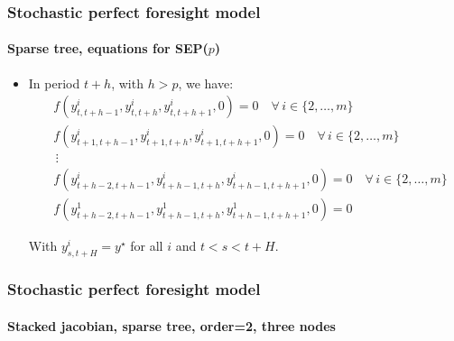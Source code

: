 \documentclass{beamer}
\begin{document}
\begin{frame}
   \frametitle{Stochastic perfect foresight model}
   \framesubtitle{Sparse tree, equations for SEP($p$)}

   \begin{itemize}

      \item In period $t+h$, with $h>p$, we have:
            \[
               \begin{split}
                   & f\left(y_{t,t+h-1}^i, y_{t,t+h}^i, y_{t,t+h+1}^i, 0\right) = 0 \quad \forall\, i\in\{2,\ldots,m\}              \\
                   & f\left(y_{t+1,t+h-1}^i, y_{t+1,t+h}^i, y_{t+1, t+h+1}^i, 0\right) = 0\quad \forall\, i\in\{2,\ldots,m\}        \\
                   & \,\vdots                                                                                                       \\
                   & f\left(y_{t+h-2,t+h-1}^i, y_{t+h-1,t+h}^i, y_{t+h-1,t+h+1}^i, 0 \right) = 0 \quad \forall\, i\in\{2,\ldots,m\} \\
                   & f\left(y_{t+h-2,t+h-1}^1, y_{t+h-1,t+h}^1, y_{t+h-1,t+h+1}^1, 0 \right) = 0
               \end{split}
            \]

            \medskip

            With $y_{s,t+H}^i = y^{\star}$ for all $i$ and $t<s<t+H$.

   \end{itemize}



\end{frame}



\begin{frame}
   \frametitle{Stochastic perfect foresight model}
   \framesubtitle{Stacked jacobian, sparse tree, order=2, three nodes}
   \begin{center}
      \scalebox{.6}{
         }
   \end{center}

\end{frame}
\end{document}
